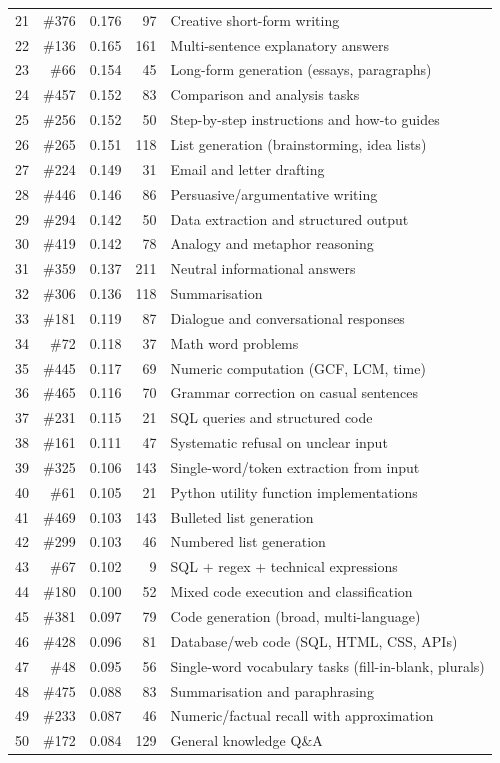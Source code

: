 \documentclass{article} %
\begin{document}
\begin{table}[h!]
\begin{tabular}{rrrrl}
21 & \#376 & 0.176 & 97 & Creative short-form writing \\
22 & \#136 & 0.165 & 161 & Multi-sentence explanatory answers \\
23 & \#66 & 0.154 & 45 & Long-form generation (essays, paragraphs) \\
24 & \#457 & 0.152 & 83 & Comparison and analysis tasks \\
25 & \#256 & 0.152 & 50 & Step-by-step instructions and how-to guides \\
26 & \#265 & 0.151 & 118 & List generation (brainstorming, idea lists) \\
27 & \#224 & 0.149 & 31 & Email and letter drafting \\
28 & \#446 & 0.146 & 86 & Persuasive/argumentative writing \\
29 & \#294 & 0.142 & 50 & Data extraction and structured output \\
30 & \#419 & 0.142 & 78 & Analogy and metaphor reasoning \\
31 & \#359 & 0.137 & 211 & Neutral informational answers \\
32 & \#306 & 0.136 & 118 & Summarisation \\
33 & \#181 & 0.119 & 87 & Dialogue and conversational responses \\
34 & \#72 & 0.118 & 37 & Math word problems \\
35 & \#445 & 0.117 & 69 & Numeric computation (GCF, LCM, time) \\
36 & \#465 & 0.116 & 70 & Grammar correction on casual sentences \\
37 & \#231 & 0.115 & 21 & SQL queries and structured code \\
38 & \#161 & 0.111 & 47 & Systematic refusal on unclear input \\
39 & \#325 & 0.106 & 143 & Single-word/token extraction from input \\
40 & \#61 & 0.105 & 21 & Python utility function implementations \\
41 & \#469 & 0.103 & 143 & Bulleted list generation \\
42 & \#299 & 0.103 & 46 & Numbered list generation \\
43 & \#67 & 0.102 & 9 & SQL + regex + technical expressions \\
44 & \#180 & 0.100 & 52 & Mixed code execution and classification \\
45 & \#381 & 0.097 & 79 & Code generation (broad, multi-language) \\
46 & \#428 & 0.096 & 81 & Database/web code (SQL, HTML, CSS, APIs) \\
47 & \#48 & 0.095 & 56 & Single-word vocabulary tasks (fill-in-blank, plurals) \\
48 & \#475 & 0.088 & 83 & Summarisation and paraphrasing \\
49 & \#233 & 0.087 & 46 & Numeric/factual recall with approximation \\
50 & \#172 & 0.084 & 129 & General knowledge Q\&A \\
\bottomrule
\end{tabular}
\end{table}
\end{document}
